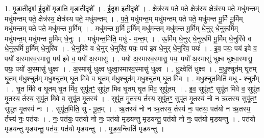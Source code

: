 \documentclass[17pt]{extarticle}
\begin{document}
1. मृ॒डा॒ती॒दृश॑ ई॒दृशे॑ मृडाति मृडाती॒दृशे᳚ । . ई॒दृश॒ इती॒दृशे᳚ । . क्षेत्र॑स्य पते पते॒ क्षेत्र॑स्य॒ क्षेत्र॑स्य पते॒ मधु॑मन्त॒म् मधु॑मन्तम् पते॒ क्षेत्र॑स्य॒ क्षेत्र॑स्य पते॒ मधु॑मन्तम् । . प॒ते॒ मधु॑मन्त॒म् मधु॑मन्तम् पते पते॒ मधु॑मन्त मू॒र्मि मू॒र्मिम् मधु॑मन्तम् पते पते॒ मधु॑मन्त मू॒र्मिम् । . मधु॑मन्त मू॒र्मि मू॒र्मिम् मधु॑मन्त॒म् मधु॑मन्त मू॒र्मिम् धे॒नुर् धे॒नुरू॒र्मिम् मधु॑मन्त॒म् मधु॑मन्त मू॒र्मिम् धे॒नुः । . मधु॑मन्त॒मिति॒ मधु॑ - म॒न्त॒म् । . ऊ॒र्मिम् धे॒नुर् धे॒नुरू॒र्मि मू॒र्मिम् धे॒नुरि॑वे व धे॒नुरू॒र्मि मू॒र्मिम् धे॒नुरि॑व । . धे॒नुरि॑वे व धे॒नुर् धे॒नुरि॑व॒ पयः॒ पय॑ इव धे॒नुर् धे॒नुरि॑व॒ पयः॑ । . इ॒व॒ पयः॒ पय॑ इवे व॒ पयो॑ अ॒स्मास्व॒स्मासु॒ पय॑ इवे व॒ पयो॑ अ॒स्मासु॑ । . पयो॑ अ॒स्मास्व॒स्मासु॒ पयः॒ पयो॑ अ॒स्मासु॑ धुक्ष्व धुक्ष्वा॒स्मासु॒ पयः॒ पयो॑ अ॒स्मासु॑ धुक्ष्व । . अ॒स्मासु॑ धुक्ष्व धुक्ष्वा॒स्मास्व॒स्मासु॑ धुक्ष्व । . धु॒क्ष्वेति॑ धुक्ष्व । . म॒धु॒श्चुत॑म् घृ॒तम् घृ॒तम् म॑धु॒श्चुत॑म् मधु॒श्चुत॑म् घृ॒त मि॑वे व घृ॒तम् म॑धु॒श्चुत॑म् मधु॒श्चुत॑म् घृ॒त मि॑व । . म॒धु॒श्चुत॒मिति॑ मधु - श्चुत᳚म् । . घृ॒त मि॑वे व घृ॒तम् घृ॒त मि॑व॒ सुपू॑तꣳ॒॒ सुपू॑त मिव घृ॒तम् घृ॒त मि॑व॒ सुपू॑तम् । . इ॒व॒ सुपू॑तꣳ॒॒ सुपू॑त मिवे व॒ सुपू॑त मृ॒तस्य॒ र्तस्य॒ सुपू॑त मिवे व॒ सुपू॑त मृ॒तस्य॑ । . सुपू॑त मृ॒तस्य॒ र्तस्य॒ सुपू॑तꣳ॒॒ सुपू॑त मृ॒तस्य॑ नो न ऋ॒तस्य॒ सुपू॑तꣳ॒॒ सुपू॑त मृ॒तस्य॑ नः । . सुपू॑त॒मिति॒ सु - पू॒त॒म् । . ऋ॒तस्य॑ नो न ऋ॒तस्य॒ र्तस्य॑ नः॒ पत॑यः॒ पत॑यो न ऋ॒तस्य॒ र्तस्य॑ नः॒ पत॑यः । . नः॒ पत॑यः॒ पत॑यो नो नः॒ पत॑यो मृडयन्तु मृडयन्तु॒ पत॑यो नो नः॒ पत॑यो मृडयन्तु । . पत॑यो मृडयन्तु मृडयन्तु॒ पत॑यः॒ पत॑यो मृडयन्तु । . मृ॒ड॒य॒न्त्विति॑ मृडयन्तु । \newline
\end{document}
